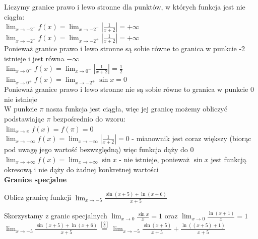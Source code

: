 \documentclass[12pt]{article}
\begin{document}
    \noindent Liczymy granice prawo i lewo stronne dla punktów, w których funkcja jest nie ciągła: \\

    \noindent $\lim_{x \to -2^{-}} f(x) = \lim_{x \to -2^{-}} |\frac{1}{x+2}| = +\infty$ \\
    \noindent $\lim_{x \to -2^{+}} f(x) = \lim_{x \to -2^{+}} |\frac{1}{x+2}| = +\infty$ \\
    \noindent Ponieważ granice prawo i lewo stronne są sobie równe to granica w punkcie -2 istnieje i jest równa $-\infty$ \\

    \noindent $\lim_{x \to 0^{-}} f(x) = \lim_{x \to 0^{-}} |\frac{1}{x+2}| = \frac{1}{2}$ \\
    \noindent $\lim_{x \to 0^{+}} f(x) = \lim_{x \to -2^{+}} \sin{x} = 0$ \\
    \noindent Ponieważ granice prawo i lewo stronne nie są sobie równe to granica w punkcie 0 nie istnieje \\

    \noindent W punkcie $\pi$ nasza funkcja jest ciągła, więc jej granicę możemy obliczyć podstawiając $\pi$ bezpośrednio do wzoru: \\
    \noindent $\lim_{x \to \pi} f(x) = f(\pi) = 0$ \\

    \noindent $\lim_{x \to -\infty} f(x) = \lim_{x \to -\infty} |\frac{1}{x+2}| = 0$ - mianownik jest coraz większy (biorąc pod uwagę jego wartość bezwzględną) więc funkcja dąży do 0 \\

    \noindent $\lim_{x \to +\infty} f(x) = \lim_{x \to +\infty} \sin{x}$ - nie istnieje, ponieważ $\sin{x}$ jest funkcją okresową i nie dąży do żadnej konkretnej wartości \\


    \noindent \textbf{Granice specjalne} \\

    \begin{exercise}
		Oblicz granicę funkcji $\lim_{x \to -5} \frac{\sin(x + 5) + \ln(x + 6)}{x + 5}$
	\end{exercise}

    \noindent Skorzystamy z granic specjalnych $\lim_{x \to 0} \frac{\sin{x}}{x} = 1$ oraz $\lim_{x \to 0} \frac{\ln(x + 1)}{x} = 1$ \\

    \noindent $\lim_{x \to -5} \frac{\sin(x + 5) + \ln(x + 6)}{x + 5} \stackrel{[\frac{0}{0}]}{=} \lim_{x \to -5} \frac{\sin(x + 5)}{x + 5} + \frac{\ln((x + 5) + 1)}{x + 5}$ \\
\end{document}
